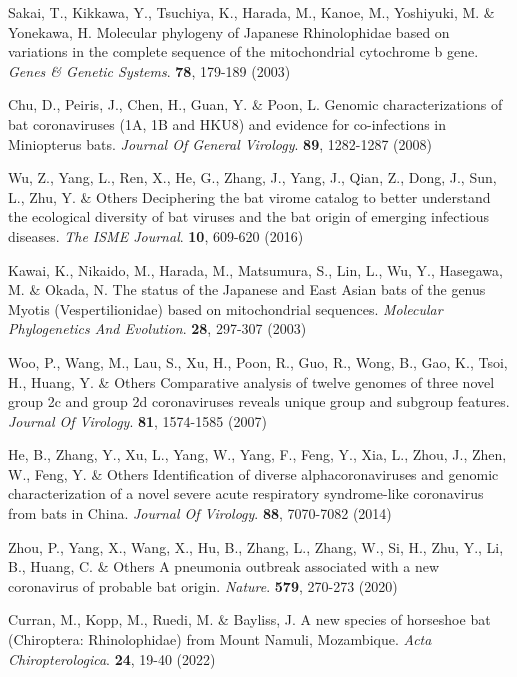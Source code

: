 \documentclass[9pt]{article}
\begin{document}
\begin{thebibliography}{999}
Sakai, T., Kikkawa, Y., Tsuchiya, K., Harada, M., Kanoe, M., Yoshiyuki, M. \& Yonekawa, H. Molecular phylogeny of Japanese Rhinolophidae based on variations in the complete sequence of the mitochondrial cytochrome b gene. {\em Genes \& Genetic Systems}. \textbf{78}, 179-189 (2003)

Chu, D., Peiris, J., Chen, H., Guan, Y. \& Poon, L. Genomic characterizations of bat coronaviruses (1A, 1B and HKU8) and evidence for co-infections in Miniopterus bats. {\em Journal Of General Virology}. \textbf{89}, 1282-1287 (2008)

Wu, Z., Yang, L., Ren, X., He, G., Zhang, J., Yang, J., Qian, Z., Dong, J., Sun, L., Zhu, Y. \& Others Deciphering the bat virome catalog to better understand the ecological diversity of bat viruses and the bat origin of emerging infectious diseases. {\em The ISME Journal}. \textbf{10}, 609-620 (2016)

Kawai, K., Nikaido, M., Harada, M., Matsumura, S., Lin, L., Wu, Y., Hasegawa, M. \& Okada, N. The status of the Japanese and East Asian bats of the genus Myotis (Vespertilionidae) based on mitochondrial sequences. {\em Molecular Phylogenetics And Evolution}. \textbf{28}, 297-307 (2003)

Woo, P., Wang, M., Lau, S., Xu, H., Poon, R., Guo, R., Wong, B., Gao, K., Tsoi, H., Huang, Y. \& Others Comparative analysis of twelve genomes of three novel group 2c and group 2d coronaviruses reveals unique group and subgroup features. {\em Journal Of Virology}. \textbf{81}, 1574-1585 (2007)

He, B., Zhang, Y., Xu, L., Yang, W., Yang, F., Feng, Y., Xia, L., Zhou, J., Zhen, W., Feng, Y. \& Others Identification of diverse alphacoronaviruses and genomic characterization of a novel severe acute respiratory syndrome-like coronavirus from bats in China. {\em Journal Of Virology}. \textbf{88}, 7070-7082 (2014)



Zhou, P., Yang, X., Wang, X., Hu, B., Zhang, L., Zhang, W., Si, H., Zhu, Y., Li, B., Huang, C. \& Others A pneumonia outbreak associated with a new coronavirus of probable bat origin. {\em Nature}. \textbf{579}, 270-273 (2020)


Curran, M., Kopp, M., Ruedi, M. \& Bayliss, J. A new species of horseshoe bat (Chiroptera: Rhinolophidae) from Mount Namuli, Mozambique. {\em Acta Chiropterologica}. \textbf{24}, 19-40 (2022)


\end{thebibliography}
\end{document}

